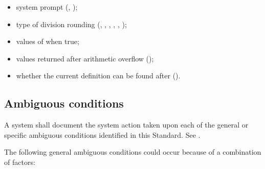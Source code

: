 \begin{itemize}
\item system prompt (,
	);

\item type of division rounding (,
	, , ,
	, );

\item values of  when true;

\item values returned after arithmetic overflow
	();

\item whether the current definition can be found after
	 ().

\end{itemize}



\subsection{Ambiguous conditions} %
\label{doc:ambiguous}

A system shall document the system action taken upon each of the
general or specific ambiguous conditions identified in this
Standard. See .

The following general ambiguous conditions could occur because of a
combination of factors:

